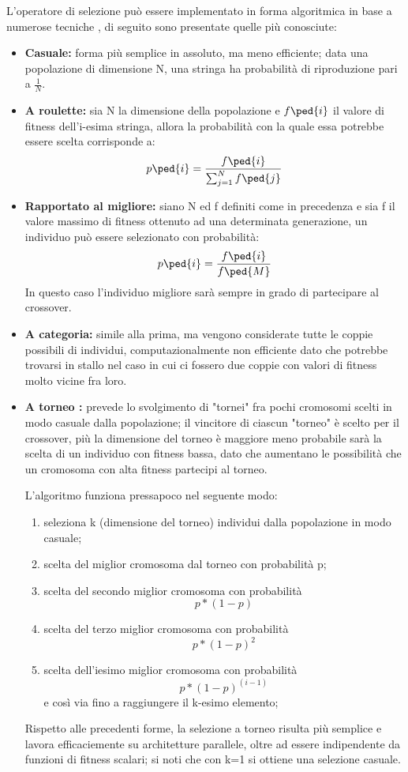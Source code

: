 L'operatore di selezione pu\`o essere implementato in forma algoritmica in base a numerose tecniche \cite{glossary} \cite{selection2}, di seguito sono presentate quelle pi\`u conosciute:
\begin{itemize}
    \item \textbf{Casuale:} forma pi\`u semplice in assoluto, ma meno efficiente; data una popolazione di dimensione N, una stringa ha probabilit\`a di riproduzione pari a \(\frac{1}{N}\).
    \item \textbf{A roulette:} sia N la dimensione della popolazione e \(f\ped{i}\) il valore di fitness dell'i-esima stringa, allora la probabilit\`a con la quale essa potrebbe essere scelta corrisponde a: $$p\ped{i}=\frac{f\ped{i}}{\sum_{j=1}^{N} f\ped{j}}$$
    \item \textbf{Rapportato al migliore:} siano N ed f definiti come in precedenza e sia f il valore massimo di fitness ottenuto ad una determinata generazione, un individuo pu\`o essere selezionato con probabilit\`a: $$p\ped{i}=\frac{f\ped{i}}{f\ped{M}}$$In questo caso l'individuo migliore sar\`a sempre in grado di partecipare al crossover.
    \item \textbf{A categoria:} simile alla prima, ma vengono considerate tutte le coppie possibili di individui, computazionalmente non efficiente dato che potrebbe trovarsi in stallo nel caso in cui ci fossero due coppie con valori di fitness molto vicine fra loro.
    \item \textbf{A torneo \cite{selection1}:} prevede lo svolgimento di "tornei" fra pochi cromosomi scelti in modo casuale dalla popolazione; il vincitore di ciascun "torneo" \`e scelto per il crossover, pi\`u la dimensione del torneo \`e maggiore meno probabile sar\`a la scelta di un individuo con fitness bassa, dato che aumentano le possibilit\`a che un cromosoma con alta fitness partecipi al torneo.
    
    L'algoritmo funziona pressapoco nel seguente modo:
    \begin{enumerate}
        \item seleziona k (dimensione del torneo) individui dalla popolazione in modo casuale;
        \item scelta del miglior cromosoma dal torneo con probabilit\`a p;
        \item scelta del secondo miglior cromosoma con probabilit\`a $$p*(1-p)$$
        \item scelta del terzo miglior cromosoma con  probabilit\`a $$p*(1-p)^2$$
        \item scelta dell'iesimo miglior cromosoma con probabilit\`a $$p*(1-p)^{(i-1)}$$ e cos\`i via fino a raggiungere il k-esimo elemento;
    \end{enumerate}
    Rispetto alle precedenti forme, la selezione a torneo risulta pi\`u semplice e lavora efficaciemente su architetture parallele, oltre ad essere indipendente da funzioni di fitness scalari; si noti che con k=1 si ottiene una selezione casuale.
\end{itemize}
